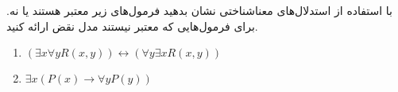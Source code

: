با استفاده از استدلال‌های معناشناختی نشان بدهید فرمول‌های زیر معتبر هستند یا نه. برای فرمول‌هایی که معتبر نیستند مدل نقض ارائه کنید.
\begin{enumerate}
\item
$(\exists x\forall y R(x,y))\leftrightarrow(\forall y \exists x R(x,y))$
\item
$\exists x(P(x)\to \forall y P(y))$
\end{enumerate}
